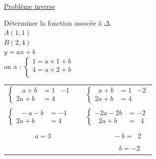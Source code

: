 \underline{Problème inverse} \\


\begin{center}
                     
\end{center}

     Déterminer la fonction assocée à $\Delta$, \\
     
     $A(1,1)$\\
     $B(2,4)$ \\
     
     $y = ax + b$ \\
     
     on a : $\begin{cases}
               1 = a \times 1 + b \\
               4 = a \times 2 + b \\ 
             \end{cases}$ \\
\bigskip  
             
\begin{tabular}{lcl}
$\left\{ \begin{array}{ll|l} 
      \;\;\; a + b  \!\!\!\!\!\!\!\! & = 1 & -1 \\
     2a + b   \!\!\!\!\!\!\!\!& = 4 & 
          \end{array} \right. $ & \hspace{1cm} 
   & $\left\{ \begin{array}{ll|l} 
                  \; \; a + b \!\!\!\!\!\!\!\!& = 1 & -2 \\
                 2a + b  \!\!\!\!\!\!\!\!& = 4 & 
              \end{array} \right. $ \\
   & & \\
$\left\{ \begin{array}{ll} 
       \; \; -a - b \!\!\!\!\!\!\!\! & = -1  \\
       2a + b \!\!\!\!\!\!\!\! & = 4
          \end{array} \right. $ & \hspace{1cm} 
   & $\left\{ \begin{array}{ll} 
                 -2a - 2b  \!\!\!\!\!\!\!\! & = -2  \\
                  \; \; 2a +  b  \!\!\!\!\!\!\!\! & = \;\; 4
               \end{array} \right. $ \\
\cline{1-1} \cline{3-3}\\
$  \qquad \qquad   a  =  3 $ & & $ \qquad \qquad -b = \; \; 2 $\\
               & & $ \qquad \qquad  \; \; \; b = -2 $ \\
\end{tabular}   

